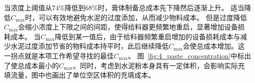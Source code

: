 当浓度上阈值从$74\%$降低到$68\%$时，膏体制备总成本先下降然后逐渐上升。
适当降低$C_{\max}$时，可以有效地避免水泥的过度添加，从而减少物料成本。
但是过度降低$C_{\max}$会缩小浓度上下限之间的间距，使得给料器更频繁地重启，显著增加设备损耗成本。
当$C_{\max}$降低到某一值后，由于给料器频繁重启增加的设备损耗成本与减少水泥过度添加节省的物料成本持平时，此后继续降低$C_{\max}$会使总成本增加。这一拐点就是本项工作希望寻找的最佳$C_{\max}$。
图~\ref{fig:4_paste_concentration}中标出了使总成本最小的$C_{\max}$。同时，考虑到水泥粉本身具有一定体积，会影响实际充填流量，图中也画出了单位空区体积的充填成本。

